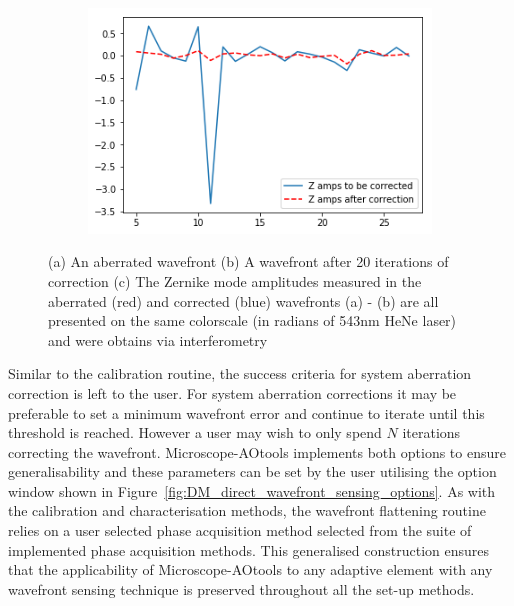 \begin{figure}[h]
	\begin{subfigure}{0.75\textwidth}
		\centering
		\includegraphics[width=1\linewidth, scale=1]{./images/Zernike_modes_before_after_correction_only_corrected.png}
		\caption{}
		\label{fig:zernike_modes_to_show_flattening}
	\end{subfigure}
	\caption{(a) An aberrated wavefront (b) A wavefront after 20 iterations of correction (c) The Zernike mode amplitudes measured in the aberrated (red) and corrected (blue) wavefronts (a) - (b) are all presented on the same colorscale (in radians of 543nm HeNe laser) and were obtains via interferometry}
	\label{fig:direct_wavefront_correction}
\end{figure}

Similar to the calibration routine, the success criteria for system aberration correction is left to the user. For system aberration corrections it may be preferable to set a minimum wavefront error and continue to iterate until this threshold is reached. However a user may wish to only spend $N$ iterations correcting the wavefront. Microscope-AOtools implements both options to ensure generalisability and these parameters can be set by the user utilising the option window shown in Figure~\ref{fig:DM_direct_wavefront_sensing_options}. As with the calibration and characterisation methods, the wavefront flattening routine relies on a user selected phase acquisition method selected from the suite of implemented phase acquisition methods. This generalised construction ensures that the applicability of Microscope-AOtools to any adaptive element with any wavefront sensing technique is preserved throughout all the set-up methods.

